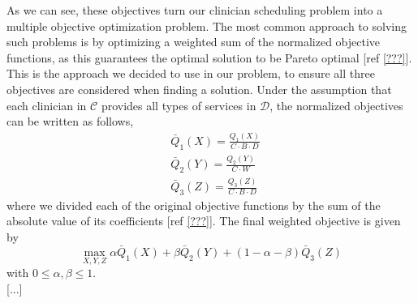 As we can see, these objectives turn our clinician scheduling problem into a multiple objective optimization problem. The most common approach to solving such problems is by optimizing a weighted sum of the normalized objective functions, as this guarantees the optimal solution to be Pareto optimal [ref \ref{???}]. This is the approach we decided to use in our problem, to ensure all three objectives are considered when finding a solution. Under the assumption that each clinician in $\mathcal{C}$ provides all types of services in $\mathcal{D}$, the normalized objectives can be written as follows,
\begin{align}
	&\bar{Q}_1(X) = \frac{Q_1(X)}{C \cdot B \cdot D} \tag{Block Requests} \label{eqn:norm-obj-block-requests}\\
	&\bar{Q}_2(Y) = \frac{Q_2(Y)}{C \cdot W} \tag{Weekend Requests} \label{eqn:norm-obj-weekend-requests} \\
	&\bar{Q}_3(Z) = \frac{Q_3(Z)}{C \cdot B \cdot D} \tag{Block-Weekend Adjacency} \label{eqn:norm-obj-block-weekend-adj}
\end{align}
where we divided each of the original objective functions by the sum of the absolute value of its coefficients [ref \ref{???}]. The final weighted objective is given by
\begin{equation}
	\max_{X, Y, Z} \alpha \bar{Q}_1(X) + \beta \bar{Q}_2(Y) + (1 - \alpha - \beta) \bar{Q}_3(Z)
\end{equation}
with $0 \leq \alpha, \beta \leq 1$. \\

[...]